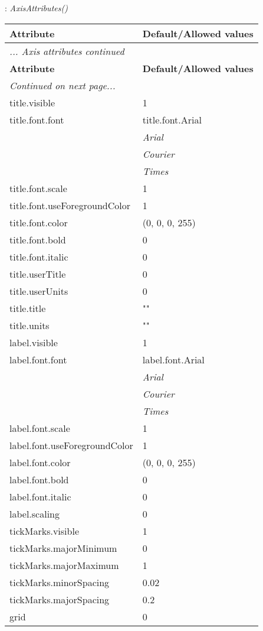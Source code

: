 \documentclass[10pt,a4paper]{report}
\begin{document}
\newpage

{}
: {\it AxisAttributes() }\\[-3mm]

\begin{longtable}{ll}
{\bf Attribute} & {\bf Default/Allowed values} \\
\hline \hline
\endfirsthead
\multicolumn{2}{l}{{\it ... Axis attributes continued}} \\
{\bf Attribute} & {\bf Default/Allowed values} \\
\hline \hline
\endhead
\hline
\multicolumn{2}{l}{{\it Continued on next page...}} \\
\endfoot
\hline
\endlastfoot

title.visible  &  1 \\
title.font.font  &  title.font.Arial   \\
 & {\it  Arial} \\
 & {\it  Courier} \\
 & {\it  Times} \\
title.font.scale  &  1 \\
title.font.useForegroundColor  &  1 \\
title.font.color  &  (0, 0, 0, 255) \\
title.font.bold  &  0 \\
title.font.italic  &  0 \\
title.userTitle  &  0 \\
title.userUnits  &  0 \\
title.title  &  "" \\
title.units  &  "" \\
label.visible  &  1 \\
label.font.font  &  label.font.Arial   \\
 & {\it  Arial} \\
 & {\it  Courier} \\
 & {\it  Times} \\
label.font.scale  &  1 \\
label.font.useForegroundColor  &  1 \\
label.font.color  &  (0, 0, 0, 255) \\
label.font.bold  &  0 \\
label.font.italic  &  0 \\
label.scaling  &  0 \\
tickMarks.visible  &  1 \\
tickMarks.majorMinimum  &  0 \\
tickMarks.majorMaximum  &  1 \\
tickMarks.minorSpacing  &  0.02 \\
tickMarks.majorSpacing  &  0.2 \\
grid  &  0 \\
\end{longtable}
\end{document}
